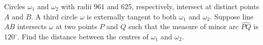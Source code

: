 Circles $\omega_1$ and $\omega_2$ with radii $961$ and $625$, respectively, intersect at distinct points $A$ and $B$. A third circle $\omega$ is externally tangent to both $\omega_1$ and $\omega_2$. Suppose line $AB$ intersects $\omega$ at two points $P$ and $Q$ such that the measure of minor arc $\widehat{PQ}$ is $120^\circ$. Find the distance between the centres of $\omega_1$ and $\omega_2$.
